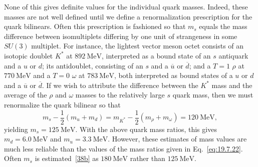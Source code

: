None of this gives definite values for the individual quark masses. Indeed, these masses are not well defined until we define a renormalization prescription for the quark bilinears. Often this prescription is fashioned so that $m_s$ equals the mass difference between isomultiplets differing by one unit of strangeness in some $SU(3)$ multiplet. For instance, the lightest vector meson octet consists of an isotopic doublet $K^*$ at $892\ \mathrm{MeV}$, interpreted as a bound state of an $s$ antiquark and a $u$ or $d$; its antidoublet, consisting of an $s$ and a $\overline u$ or $\overline d$; and a $T=1$ $\rho$ at $770\ \mathrm{MeV}$ and a $T=0$ $\omega$ at $783\ \mathrm{MeV}$, both interpreted as bound states of a $u$ or $d$ and a $\overline u$ or $\overline d$. If we wish to attribute the difference between the $K^*$ mass and the average of the $\rho$ and $\omega$ masses to the relatively large $s$ quark mass, then we must renormalize the quark bilinear so that
\[
m_s-\frac12(m_u+m_d)
=m_{K^*}-\frac12(m_\rho+m_\omega)
=120\ \mathrm{MeV},
\]
yielding $m_s=125\ \mathrm{MeV}$. With the above quark mass ratios, this gives $m_d=6.0\ \mathrm{MeV}$ and $m_u=3.3\ \mathrm{MeV}$. However, these estimates of mass values are much less reliable than the values of the mass ratios given in Eq.~\eqref{eq:19.7.22}. Often $m_s$ is estimated~\hyperref[ch19-ref-38b]{[38b]} as $180\ \mathrm{MeV}$ rather than $125\ \mathrm{MeV}$.

